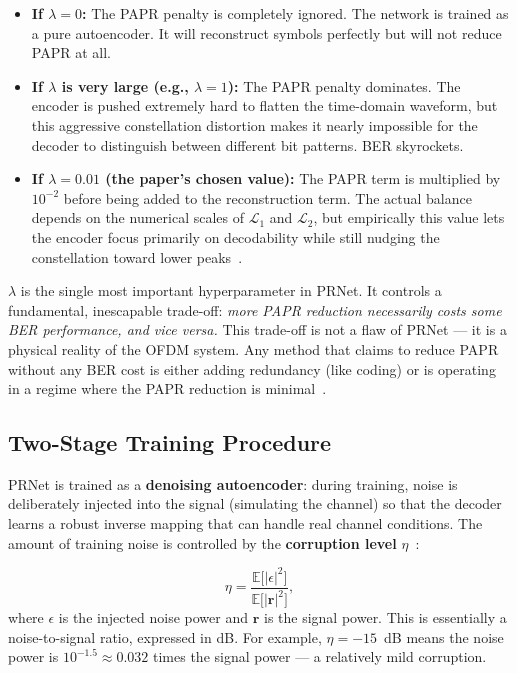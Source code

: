 \begin{itemize}
    \item \textbf{If $\lambda = 0$:} The PAPR penalty is completely ignored. The network is trained as a pure autoencoder.  It will reconstruct symbols perfectly but will not reduce PAPR at all.
    \item \textbf{If $\lambda$ is very large (e.g., $\lambda = 1$):} The PAPR penalty dominates.  The encoder is pushed extremely hard to flatten the time-domain waveform, but this aggressive constellation distortion makes it nearly impossible for the decoder to distinguish between different bit patterns.  BER skyrockets.
    \item \textbf{If $\lambda = 0.01$ (the paper's chosen value):} The PAPR term is multiplied by $10^{-2}$ before being added to the reconstruction term.  The actual balance depends on the numerical scales of $\mathcal{L}_1$ and $\mathcal{L}_2$, but empirically this value lets the encoder focus primarily on decodability while still nudging the constellation toward lower peaks~\cite{kim2017novel}.
\end{itemize}

\begin{keyinsight}
    $\lambda$ is the single most important hyperparameter in PRNet. It controls a fundamental, inescapable trade-off: \emph{more PAPR reduction necessarily costs some BER performance, and vice versa.} This trade-off is not a flaw of PRNet --- it is a physical reality of the OFDM system.  Any method that claims to reduce PAPR without any BER cost is either adding redundancy (like coding) or is operating in a regime where the PAPR reduction is minimal~\cite{kim2017novel}.
\end{keyinsight}


\subsection{Two-Stage Training Procedure}

PRNet is trained as a \textbf{denoising autoencoder}: during training, noise is deliberately injected into the signal (simulating the channel) so that the decoder learns a robust inverse mapping that can handle real channel conditions.  The amount of training noise is controlled by the \textbf{corruption level} $\eta$~\cite{kim2017novel}:

\begin{equation*}
    \eta = \frac{\mathbb{E}\bigl[|\epsilon|^2\bigr]}
    {\mathbb{E}\bigl[|\bm{r}|^2\bigr]},
\end{equation*}
where $\epsilon$ is the injected noise power and $\bm{r}$ is the signal power.  This is essentially a noise-to-signal ratio, expressed in dB. For example, $\eta = -15$~dB means the noise power is $10^{-1.5} \approx 0.032$ times the signal power --- a relatively mild corruption.

